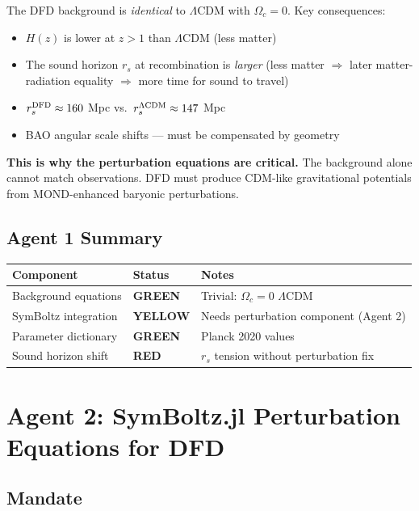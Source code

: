 \documentclass[11pt,a4paper]{article}
\newcommand{\GREEN}{\textcolor{dfdgreen}{\textbf{GREEN}}}
\newcommand{\YELLOW}{\textcolor{dfdyellow}{\textbf{YELLOW}}}
\newcommand{\RED}{\textcolor{dfdred}{\textbf{RED}}}
\begin{document}
The DFD background is \emph{identical} to $\Lambda$CDM with $\Omega_c = 0$. Key consequences:
\begin{itemize}
\item $H(z)$ is lower at $z > 1$ than $\Lambda$CDM (less matter)
\item The sound horizon $r_s$ at recombination is \emph{larger} (less matter $\Rightarrow$ later matter-radiation equality $\Rightarrow$ more time for sound to travel)
\item $r_s^{\rm DFD} \approx 160$ Mpc vs.\ $r_s^{\Lambda\rm CDM} \approx 147$ Mpc
\item BAO angular scale shifts --- must be compensated by geometry
\end{itemize}

\textbf{This is why the perturbation equations are critical.} The background alone cannot match observations. DFD must produce CDM-like gravitational potentials from MOND-enhanced baryonic perturbations.

\subsection{Agent 1 Summary}

\begin{center}
\begin{tabular}{lll}
\toprule
\textbf{Component} & \textbf{Status} & \textbf{Notes} \\
\midrule
Background equations & \GREEN & Trivial: $\Omega_c = 0$ $\Lambda$CDM \\
SymBoltz integration & \YELLOW & Needs perturbation component (Agent 2) \\
Parameter dictionary & \GREEN & Planck 2020 values \\
Sound horizon shift & \RED & $r_s$ tension without perturbation fix \\
\bottomrule
\end{tabular}
\end{center}

\section{Agent 2: SymBoltz.jl Perturbation Equations for DFD}
\label{sec:agent2}

\subsection{Mandate}
\end{document}
